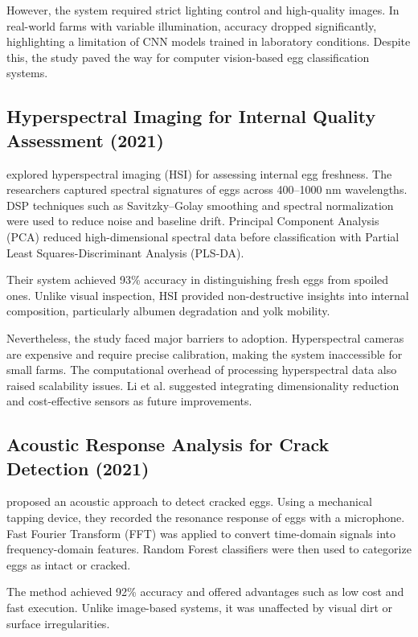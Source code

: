 \documentclass[conference]{IEEEtran}
\begin{document}
	However, the system required strict lighting control and high-quality images. In real-world farms with variable illumination, accuracy dropped significantly, highlighting a limitation of CNN models trained in laboratory conditions. Despite this, the study paved the way for computer vision-based egg classification systems.
	
	\subsection{Hyperspectral Imaging for Internal Quality Assessment (2021)}
	\cite{li2021hsi} explored hyperspectral imaging (HSI) for assessing internal egg freshness. The researchers captured spectral signatures of eggs across 400–1000 nm wavelengths. DSP techniques such as Savitzky–Golay smoothing and spectral normalization were used to reduce noise and baseline drift. Principal Component Analysis (PCA) reduced high-dimensional spectral data before classification with Partial Least Squares-Discriminant Analysis (PLS-DA).  
	
	Their system achieved 93\% accuracy in distinguishing fresh eggs from spoiled ones. Unlike visual inspection, HSI provided non-destructive insights into internal composition, particularly albumen degradation and yolk mobility.  
	
	Nevertheless, the study faced major barriers to adoption. Hyperspectral cameras are expensive and require precise calibration, making the system inaccessible for small farms. The computational overhead of processing hyperspectral data also raised scalability issues. Li et al. suggested integrating dimensionality reduction and cost-effective sensors as future improvements.
	
	\subsection{Acoustic Response Analysis for Crack Detection (2021)}
	\cite{wang2021acoustic} proposed an acoustic approach to detect cracked eggs. Using a mechanical tapping device, they recorded the resonance response of eggs with a microphone. Fast Fourier Transform (FFT) was applied to convert time-domain signals into frequency-domain features. Random Forest classifiers were then used to categorize eggs as intact or cracked.  
	
	The method achieved 92\% accuracy and offered advantages such as low cost and fast execution. Unlike image-based systems, it was unaffected by visual dirt or surface irregularities.  
	
\end{document}
